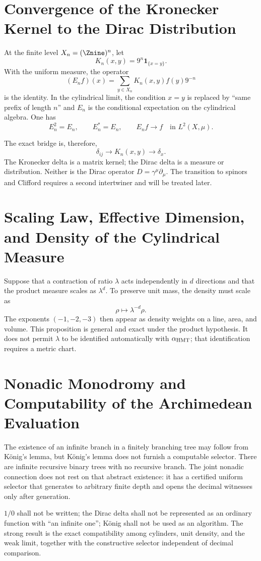 \section{Convergence of the Kronecker Kernel to the Dirac Distribution}

At the finite level \(X_n=(\Znine)^n\), let
\[
K_n(x,y)=9^n\mathbf1_{\{x=y\}}.
\]
With the uniform measure, the operator
\[
(E_nf)(x)=\sum_{y\in X_n}K_n(x,y)f(y)9^{-n}
\]
is the identity. In the cylindrical limit, the condition \(x=y\) is replaced by
“same prefix of length \(n\)” and \(E_n\) is the conditional expectation on
the cylindrical algebra. One has
\[
E_n^2=E_n,\qquad E_n^*=E_n,\qquad E_nf\to f
\quad\text{in }L^2(X,\mu).
\]

The exact bridge is, therefore,
\[
\delta_{ij}
\longrightarrow K_n(x,y)
\longrightarrow\delta_x.
\]
The Kronecker delta is a matrix kernel; the Dirac delta is a measure or
distribution. Neither is the Dirac operator
\(D=\gamma^\mu\partial_\mu\). The transition to spinors and Clifford requires
a second intertwiner and will be treated later.

\section{Scaling Law, Effective Dimension, and Density of the Cylindrical Measure}

Suppose that a contraction of ratio \(\lambda\) acts independently
in \(d\) directions and that the product measure scales as \(\lambda^d\). To
preserve unit mass, the density must scale as
\[
\rho\longmapsto\lambda^{-d}\rho.
\]
The exponents \((-1,-2,-3)\) then appear as density weights on a line,
area, and volume. This proposition is general and exact under the product
hypothesis. It does not permit \(\lambda\) to be identified automatically with
\(\alpha_{\rm HMT}\); that identification requires a metric chart.

\section{Nonadic Monodromy and Computability of the Archimedean Evaluation}

The existence of an infinite branch in a finitely branching tree may
follow from König's lemma, but König's lemma does not furnish a computable selector. There
are infinite recursive binary trees with no recursive branch. The joint nonadic
connection does not rest on that abstract existence: it has a certified uniform
selector that generates to arbitrary finite depth and opens the decimal witnesses
only after generation.

\begin{falsadorBox}[title={Three prohibited confusions}]
\(1/0\) shall not be written; the Dirac delta shall not be represented as an ordinary
function with “an infinite one”; König shall not be used as an algorithm. The strong
result is the exact compatibility among cylinders, unit density, and the weak
limit, together with the constructive selector independent of decimal comparison.
\end{falsadorBox}
